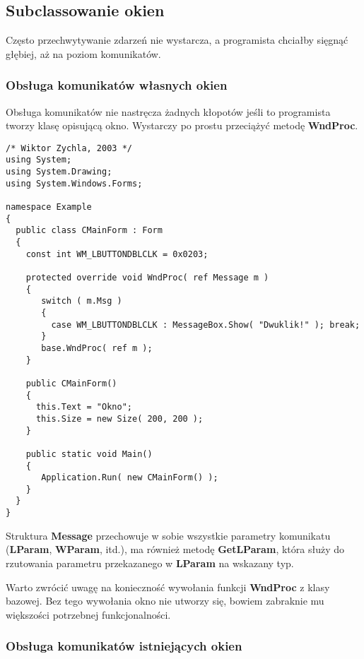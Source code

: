﻿\subsection{Subclassowanie okien}

Często przechwytywanie zdarzeń nie wystarcza, a programista chciałby sięgnąć głębiej, aż na poziom
komunikatów. 

\subsubsection{Obsługa komunikatów własnych okien}

Obsługa komunikatów nie nastręcza żadnych kłopotów jeśli to programista tworzy klasę
opisującą okno. Wystarczy po prostu przeciążyć metodę {\bf WndProc}.

\begin{scriptsize}
\begin{verbatim}
/* Wiktor Zychla, 2003 */
using System;
using System.Drawing;
using System.Windows.Forms;

namespace Example
{
  public class CMainForm : Form
  {   
    const int WM_LBUTTONDBLCLK = 0x0203;

    protected override void WndProc( ref Message m )
    {
       switch ( m.Msg )
       {
         case WM_LBUTTONDBLCLK : MessageBox.Show( "Dwuklik!" ); break;
       }
       base.WndProc( ref m );
    }

    public CMainForm()
    {
      this.Text = "Okno"; 
      this.Size = new Size( 200, 200 );
    }

    public static void Main()
    {
       Application.Run( new CMainForm() );
    }
  }
}
\end{verbatim}
\end{scriptsize}

Struktura {\bf Message} przechowuje w sobie wszystkie parametry komunikatu ({\bf LParam}, {\bf WParam}, itd.),
ma również metodę {\bf GetLParam}, która służy do rzutowania parametru przekazanego w {\bf LParam} na wskazany
typ.

Warto zwrócić uwagę na konieczność wywołania funkcji {\bf WndProc} z klasy bazowej. Bez tego wywołania okno
nie utworzy się, bowiem zabraknie mu większości potrzebnej funkcjonalności.

\subsubsection{Obsługa komunikatów istniejących okien}

